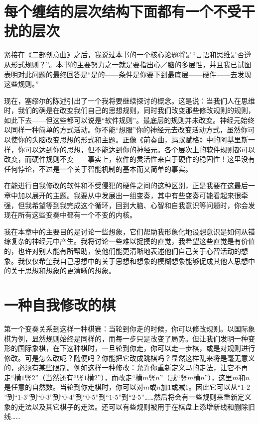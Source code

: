 \section{每个缠结的层次结构下面都有一个不受干扰的层次}

紧接在《二部创意曲》之后，我说过本书的一个核心论题将是“言语和思维是否遵从形式规则？”。本书的主要努力之一就是要指出心／脑的多层性，并且我已试图表明对此问题的最终回答是“是的——条件是你要下到最底层——硬件——去发现这些规则。”

现在，塞缪尔的陈述引出了一个我将要继续探讨的概念。这是说：当我们人在思维时，我们的确是在改变我们自己的思想规则，同时我们改变那些修改规则的规则，如此下去——但这些都可以说是“软件规则”。最底层的规则并未改变。神经元始终以同样一种简单的方式活动。你不能“想服”你的神经元去改变活动方式，虽然你可以使你的头脑改变思想的形式和主题。正像《前奏曲，蚂蚁赋格》中的阿基里斯一样，你可以达到你的思想，但不能达到你的神经元。各个层次上的软件规则都可以改变，而硬件规则不变——事实上，软件的灵活性来自于硬件的稳固性！这里没有任何悖论，不过是一个关于智能机制的基本而又简单的事实。

在能进行自我修改的软件和不受侵犯的硬件之间的这种区别，正是我要在这最后一章中加以展开的主题。我要从中发展出一组变奏，其中有些变奏可能看起来很牵强，但我希望等到我完成这个循环，回到大脑、心智和自我意识等问题时，你会发现在所有这些变奏中都有一个不变的内核。

我在本章中的主要目的是讨论一些想象，它们帮助我形象化地设想意识是如何从错综复杂的神经元中产生。我将讨论一些难以捉摸的直觉，我希望这些直觉是有价值的，也许对别人能有所帮助，使他们能更清晰地表述他们自己关于心智活动的想象。我仅仅希望我自己思想中的关于思想和想象的模糊想象能够促成其他人思想中的关于思想和想象的更清晰的想象。

\section{一种自我修改的棋}

第一个变奏关系到这样一种棋赛：当轮到你走的时候，你可以修改规则。以国际象棋为例，显然规则始终是同样的，而每一步只是改变了局势。但让我们发明一种变形的国际象棋，在下这种棋时，一旦轮到你走，你可以走一步棋，或是对规则进行修改。可是怎么改呢？随便吗？你能把它改成跳棋吗？显然这样乱来将是毫无意义的，必须有某些限制。例如这样一种修改：允许你重新定义马的走法，让它不再走“横$1$竖$2$”（当然还有“竖$1$横$2$”），而改走“横$m$竖$n$”（或“竖$m$横$n$”），这里$m$和$n$是任意的自然数。当轮到你走棋时，你可以对$m$或$n$加$1$或减$1$。因此它可以从“$1$-$2$”到“$1$-$3$”到“$0$-$3$”到“$0$-$4$”到“$0$-$5$”到“$1$-$5$”到“$2$-$5$”……然后将会有一些规则来重新定义象的走法以及其它棋子的走法。还可以有些规则被用于在棋盘上添增新线和删除旧线……

